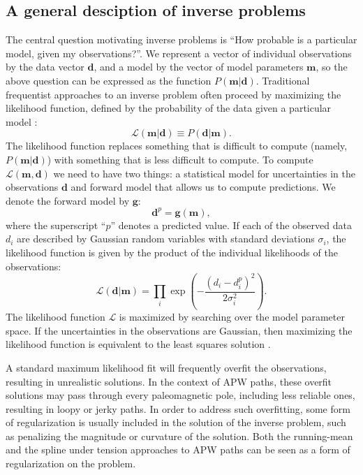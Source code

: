\documentclass[preprint,12pt,authoryear]{elsarticle}
\begin{document}
\subsection{A general desciption of inverse problems}
\label{sec:intro_inverse_problems}
The central question motivating inverse problems is ``How probable is a particular model, given my observations?''.
We represent a vector of individual observations by the data vector $\mathbf{d}$, and a model
by the vector of model parameters $\mathbf{m}$, so the above question can be expressed as the function $P(\mathbf{m} \vert \mathbf{d})$.
Traditional frequentist approaches to an inverse problem often proceed by maximizing the likelihood function,
defined by the probability of the data given a particular model \citep[e.g][]{aster2005parameter}:
\begin{equation}
\mathcal{L} ( \mathbf{m} \vert \mathbf{d} ) \equiv P( \mathbf{d} \vert \mathbf{m} ).
\label{eq:likelihood}
\end{equation}
The likelihood function replaces something that is difficult to compute (namely, $P(\mathbf{m} \vert \mathbf{d})$)
with something that is less difficult to compute. 
To compute $\mathcal{L}(\mathbf{m}, \mathbf{d})$ we need to have two things: a statistical model for 
uncertainties in the observations $\mathbf{d}$ and forward model that allows us to compute
predictions. We denote the forward model by $\mathbf{g}$:
\begin{equation}
\mathbf{d}^p = \mathbf{g}(\mathbf{m}),
\label{eq:forward}
\end{equation}
where the superscript ``$p$'' denotes a predicted value.
If each of the observed data $d_i$ are described by Gaussian random variables
with standard deviations $\sigma_i$, the likelihood function is given by the product
of the individual likelihoods of the observations:
\begin{equation}
\mathcal{L}(\mathbf{d} | \mathbf{m} ) = \displaystyle\prod_i \exp\left({-\frac{(d_i - d_{i}^p)^2}{2 \sigma_i^2}}\right).
\label{eq:example_likelihood}
\end{equation}
The likelihood function $\mathcal{L}$ is maximized by searching over the model parameter space.
If the uncertainties in the observations are Gaussian, then maximizing the likelihood function is
equivalent to the least squares solution \citep{aster2005parameter}.

A standard maximum likelihood fit will frequently overfit the observations, resulting
in unrealistic solutions. In the context of APW paths, these overfit solutions may
pass through every paleomagnetic pole, including less reliable ones, resulting in
loopy or jerky paths. In order to address such overfitting, some form of regularization is usually
included in the solution of the inverse problem, such as penalizing the magnitude or
curvature of the solution. Both the running-mean and the spline under tension approaches
to APW paths can be seen as a form of regularization on the problem.
\end{document}
